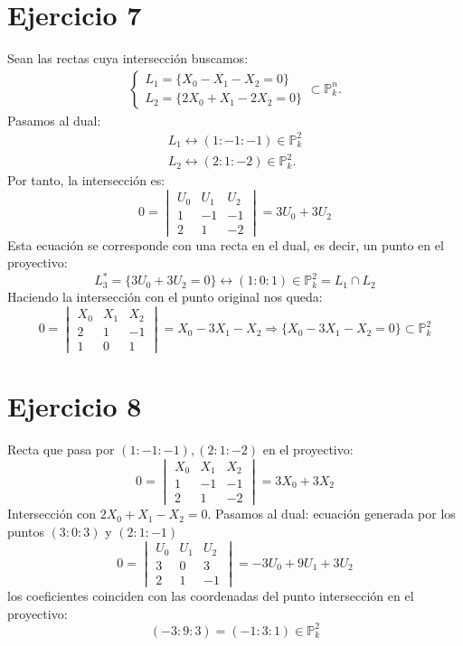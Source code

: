 \documentclass[10pt,a4paper,openright]{book}
\theoremstyle{break}
\begin{document}
\section{Ejercicio 7}%
\label{sec:7}
Sean las rectas cuya intersección buscamos:
\begin{gather*}
\begin{cases}
    L_1 = \{X_0 - X_1 - X_2 = 0\} \\
    L_2 = \{2X_0 + X_1 - 2X_2 = 0\}     
\end{cases} \subset \mathbb{P}^{n}_{k} 
.\end{gather*}
Pasamos al dual: 
\begin{gather*}
    L_1 \leftrightarrow \left( 1 : -1 : -1 \right) \in \mathbb{P}^{2}_{k} \\
    L_2 \leftrightarrow \left( 2 : 1 : -2 \right) \in \mathbb{P}^{2}_{k} 
.\end{gather*}
Por tanto, la intersección es: 
\[
    0 = \begin{vmatrix} U_0 & U_1 & U_2\\ 1 & -1 & -1\\ 2 & 1 & -2 \end{vmatrix} = 3U_0 + 3U_2
\]
Esta ecuación se corresponde con una recta en el dual, es decir, un punto en el proyectivo:
\[
L_3^* = \{3U_0 + 3U_2 = 0\} \leftrightarrow \left( 1 : 0 : 1 \right) \in \mathbb{P}^{2}_{k} = L_1 \cap L_2
\]
Haciendo la intersección con el punto original nos queda:
\[
    0 = \begin{vmatrix} X_0 & X_1 & X_2\\ 2 & 1 & -1\\ 1 & 0 & 1 \end{vmatrix} = X_0 - 3X_1 - X_2 \Rightarrow \{X_0 - 3X_1 - X_2 = 0\} \subset \mathbb{P}^{2}_{k} 
\]

\section{Ejercicio 8}%
\label{sec:8}
Recta que pasa por $\left( 1 : -1 : -1 \right), \left( 2 : 1 : -2 \right)$ en el proyectivo:
\[
    0 = \begin{vmatrix} X_0 & X_1 & X_2\\ 1 & -1 & -1\\ 2 & 1 & -2 \end{vmatrix} = 3X_0 + 3X_2
\]
Intersección con $2X_0 + X_1 - X_2 = 0$. Pasamos al dual: ecuación generada por los puntos $\left( 3 : 0 : 3 \right)$ y $\left( 2 : 1 : -1 \right)$
\[
    0 = \begin{vmatrix} U_0 & U_1 & U_2\\ 3 & 0 & 3\\ 2 & 1 & -1 \end{vmatrix} = -3U_0 + 9U_1 + 3U_2
\]
los coeficientes coinciden con las coordenadas del punto intersección en el proyectivo:
\[
\left( -3 : 9 : 3 \right) = \left( -1 : 3 : 1 \right) \in \mathbb{P}^{2}_{k} 
\]
\end{document}
